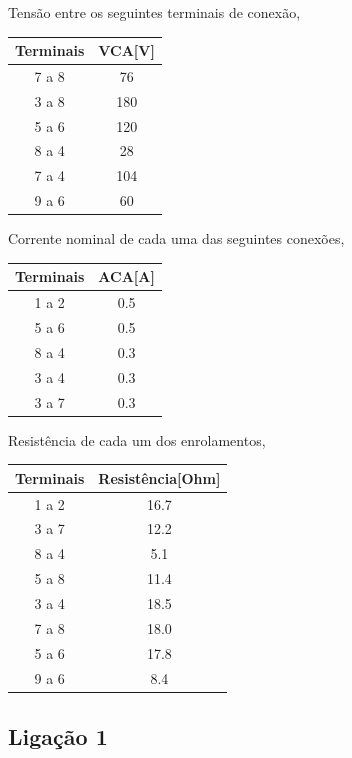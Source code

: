 \documentclass[conference]{IEEEtran}
\begin{document}
Tensão entre os seguintes terminais de conexão,
\begin{center}
    \begin{tabular}{|c||c|}
        \hline 
        Terminais & VCA[V] \\
        \hline 
        7 a 8 & 76 \\
        3 a 8 & 180 \\
        5 a 6 & 120 \\
        8 a 4 & 28 \\
        7 a 4 & 104 \\
        9 a 6 & 60 \\
        \hline
    \end{tabular}
\end{center}

Corrente nominal de cada uma das seguintes conexões,
\begin{center}
    \begin{tabular}{|c||c|}
        \hline 
        Terminais & ACA[A] \\
        \hline 
        1 a 2 & 0.5 \\
        5 a 6 & 0.5 \\
        8 a 4 & 0.3 \\
        3 a 4 & 0.3 \\
        3 a 7 & 0.3 \\
        \hline
    \end{tabular}
\end{center}

Resistência de cada um dos enrolamentos,
\begin{center}
    \begin{tabular}{|c||c|}
        \hline 
        Terminais & Resistência[Ohm] \\
        \hline 
        1 a 2 & 16.7 \\
        3 a 7 & 12.2 \\
        8 a 4 & 5.1 \\
        5 a 8 & 11.4 \\
        3 a 4 & 18.5 \\
        7 a 8 & 18.0 \\
        5 a 6 & 17.8 \\
        9 a 6 & 8.4 \\
        \hline
    \end{tabular}
\end{center}



\subsection{Ligação 1}
\end{document}
